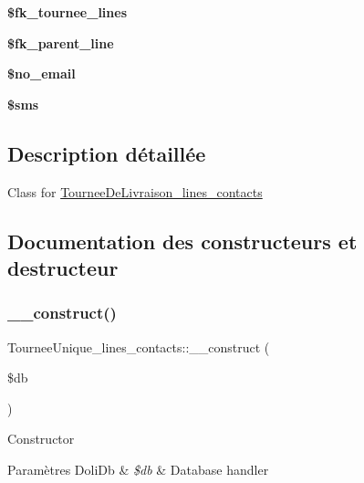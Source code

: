 \begin{DoxyCompactItemize}
{\bfseries \$fk\+\_\+tournee\+\_\+lines}
\item 
\mbox{\label{classTourneeUnique__lines__contacts_a1a436d06d42d007f510558dd579508f5}} 
{\bfseries \$fk\+\_\+parent\+\_\+line}
\item 
\mbox{\label{classTourneeUnique__lines__contacts_a4e49d4cd310d6296407860a6f85aa00a}} 
{\bfseries \$no\+\_\+email}
\item 
\mbox{\label{classTourneeUnique__lines__contacts_a14852de198fdc4966bedb7a931938995}} 
{\bfseries \$sms}
\end{DoxyCompactItemize}


\subsection{Description détaillée}
Class for \hyperlink{classTourneeDeLivraison__lines__contacts}{Tournee\+De\+Livraison\+\_\+lines\+\_\+contacts} 

\subsection{Documentation des constructeurs et destructeur}
\mbox{\label{classTourneeUnique__lines__contacts_aacce69261ed9384fa8ae5bc952ea336d}} 
\subsubsection{\texorpdfstring{\+\_\+\+\_\+construct()}{\_\_construct()}}
{\footnotesize\ttfamily Tournee\+Unique\+\_\+lines\+\_\+contacts\+::\+\_\+\+\_\+construct (\begin{DoxyParamCaption}\item[{Doli\+DB}]{\$db }\end{DoxyParamCaption})}

Constructor


\begin{DoxyParams}[1]{Paramètres}
Doli\+Db & {\em \$db} & Database handler \\
\hline
\end{DoxyParams}


